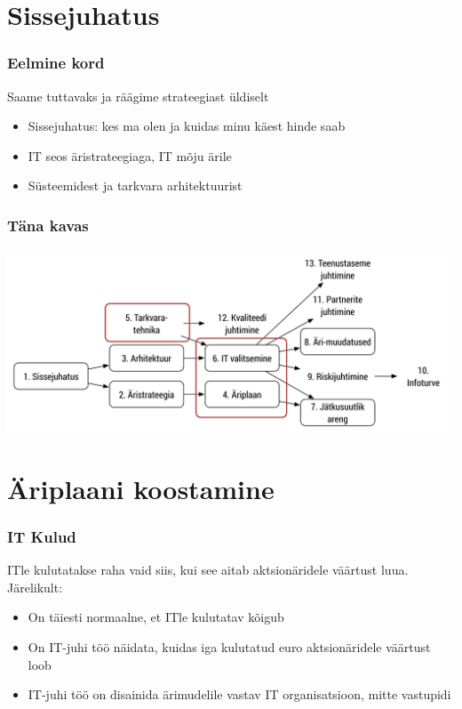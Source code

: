 

\maketitle

\section{Sissejuhatus}
\begin{frame}[fragile]
  \frametitle{Eelmine kord}
  Saame tuttavaks ja räägime strateegiast üldiselt
	\begin{itemize}
		\item Sissejuhatus: kes ma olen ja kuidas minu käest hinde saab
		\item IT seos äristrateegiaga, IT mõju ärile
		\item Süsteemidest ja tarkvara arhitektuurist
	\end{itemize}
\end{frame}

\begin{frame}[fragile]
  \frametitle{Täna kavas}
		\includegraphics[width=\textwidth]{aine_struktuur_teine.pdf}
\end{frame}

\section{Äriplaani koostamine}
\begin{frame}[fragile]
  \frametitle{IT Kulud}
  	ITle kulutatakse raha vaid siis, kui see aitab aktsionäridele väärtust luua. Järelikult:
	\begin{itemize}
		\item On täiesti normaalne, et ITle kulutatav kõigub
		\item On IT-juhi töö näidata, kuidas iga kulutatud euro aktsionäridele väärtust loob
		\item IT-juhi töö on disainida ärimudelile vastav IT organisatsioon, mitte vastupidi
	\end{itemize}
\end{frame}

